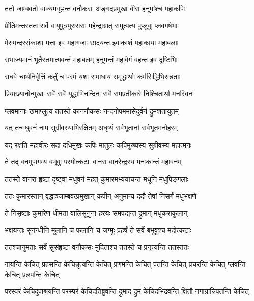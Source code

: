 
\twolineshloka
{ततो जाम्बवतो वाक्यमगृह्णन्त वनौकसः}
{अङ्गदप्रमुखा वीरा हनूमांश्च महाकपिः} %

\twolineshloka
{प्रीतिमन्तस्ततः सर्वे वायुपुत्रपुरःसराः}
{महेन्द्राग्रात् समुत्पत्य पुप्लुवुः प्लवगर्षभाः} %

\twolineshloka
{मेरुमन्दरसंकाशा मत्ता इव महागजाः}
{छादयन्त इवाकाशं महाकाया महाबलाः} %

\twolineshloka
{सभाज्यमानं भूतैस्तमात्मवन्तं महाबलम्}
{हनूमन्तं महावेगं वहन्त इव दृष्टिभिः} %

\twolineshloka
{राघवे चार्थनिर्वृत्तिं कर्तुं च परमं यशः}
{समाधाय समृद्धार्थाः कर्मसिद्धिभिरुन्नताः} %

\twolineshloka
{प्रियाख्यानोन्मुखाः सर्वे सर्वे युद्धाभिनन्दिनः}
{सर्वे रामप्रतीकारे निश्चितार्था मनस्विनः} %

\twolineshloka
{प्लवमानाः खमाप्लुत्य ततस्ते काननौकसः}
{नन्दनोपममासेदुर्वनं द्रुमशतायुतम्} %

\twolineshloka
{यत् तन्मधुवनं नाम सुग्रीवस्याभिरक्षितम्}
{अधृष्यं सर्वभूतानां सर्वभूतमनोहरम्} %

\twolineshloka
{यद् रक्षति महावीरः सदा दधिमुखः कपिः}
{मातुलः कपिमुख्यस्य सुग्रीवस्य महात्मनः} %

\twolineshloka
{ते तद् वनमुपागम्य बभूवुः परमोत्कटाः}
{वानरा वानरेन्द्रस्य मनःकान्तं महावनम्} %

\twolineshloka
{ततस्ते वानरा हृष्टा दृष्ट्वा मधुवनं महत्}
{कुमारमभ्ययाचन्त मधूनि मधुपिङ्गलाः} %

\twolineshloka
{ततः कुमारस्तान् वृद्धाञ्जाम्बवत्प्रमुखान् कपीन्}
{अनुमान्य ददौ तेषां निसर्गं मधुभक्षणे} %

\twolineshloka
{ते निसृष्टाः कुमारेण धीमता वालिसूनुना}
{हरयः समपद्यन्त द्रुमान् मधुकराकुलान्} %

\twolineshloka
{भक्षयन्तः सुगन्धीनि मूलानि च फलानि च}
{जग्मुः प्रहर्षं ते सर्वे बभूवुश्च मदोत्कटाः} %

\twolineshloka
{ततश्चानुमताः सर्वे सुसंहृष्टा वनौकसः}
{मुदिताश्च ततस्ते च प्रनृत्यन्ति ततस्ततः} %

\twolineshloka
{गायन्ति केचित् प्रहसन्ति केचिन्नृत्यन्ति केचित् प्रणमन्ति केचित्}
{पतन्ति केचित् प्रचरन्ति केचित् प्लवन्ति केचित् प्रलपन्ति केचित्} %

\twolineshloka
{परस्परं केचिदुपाश्रयन्ति परस्परं केचिदतिब्रुवन्ति}
{द्रुमाद् द्रुमं केचिदभिद्रवन्ति क्षितौ नगाग्रान्निपतन्ति केचित्} %

